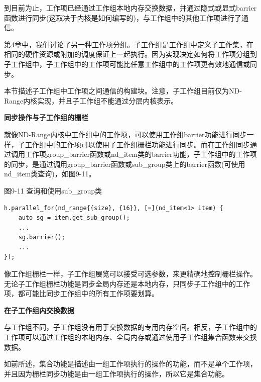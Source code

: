 到目前为止，工作项已经通过工作组本地内存交换数据，并通过隐式或显式barrier函数进行同步(这取决于内核是如何编写的)，与工作组中的其他工作项进行了通信。\par

第4章中，我们讨论了另一种工作项分组。子工作组是工作组中定义子工作集，在相同的硬件资源或附加的调度保证上一起执行。因为实现决定如何将工作项分组到子工作组中，子工作组中的工作项可能比任意工作组中的工作项更有效地通信或同步。\par

本节描述子工作组中工作项之间通信的构建块。注意，子工作组目前仅为ND-Range内核实现，并且子工作组不能通过分层内核表示。\par

\hspace*{\fill} \par %
\textbf{同步操作与子工作组的栅栏}

就像ND-Range内核中工作组中的工作项，可以使用工作组barrier功能进行同步一样，子工作组中的工作项可以使用子工作组栅栏功能进行同步。而在工作组同步通过调用工作项group\_barrier函数或nd\_item类的barrier功能，子工作组中的工作项的同步，是通过调用group\_barrier函数或sub\_group类上的barrier函数(可使用nd\_item类查询)，如图9-11。\par

\hspace*{\fill} \par %
图9-11 查询和使用sub\_group类
\begin{lstlisting}[caption={}]
h.parallel_for(nd_range{{size}, {16}}, [=](nd_item<1> item) {
	auto sg = item.get_sub_group();
	...
	sg.barrier();
	...
});
\end{lstlisting}

像工作组栅栏一样，子工作组展览可以接受可选参数，来更精确地控制栅栏操作。无论子工作组栅栏功能是同步全局内存还是本地内存，只同步子工作组中的工作项，都可能比同步工作组中的所有工作项要划算。\par

\hspace*{\fill} \par %
\textbf{在子工作组内交换数据}

与工作组不同，子工作组没有用于交换数据的专用内存空间。相反，子工作组中的工作项可以通过工作组的本地内存、全局内存或通过使用子工作组集合函数来交换数据。\par

如前所述，集合功能是描述由一组工作项执行的操作的功能，而不是单个工作项，并且因为栅栏同步功能是由一组工作项执行的操作，所以它是集合功能。\par

